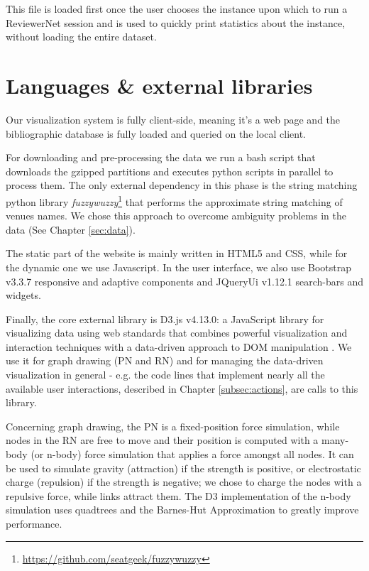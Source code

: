 This file is loaded first once the user chooses the instance upon which to run a ReviewerNet session and is used to quickly print statistics about the instance, without loading the entire dataset.
\section{Languages \& external libraries}
\label{sec:lang}

Our visualization system is fully client-side, meaning it's a web page and the bibliographic database is fully loaded and queried on the local client.

For downloading and pre-processing the data we run a bash script that downloads the gzipped partitions and executes python scripts in parallel to process them. The only external dependency in this phase is the string matching python library \emph{fuzzywuzzy}\footnote{\url{https://github.com/seatgeek/fuzzywuzzy}} that performs the approximate string matching of venues names. We chose this approach to overcome ambiguity problems in the data (See Chapter \ref{sec:data}).

The static part of the website is mainly written in HTML5 and CSS, while for the dynamic one we use Javascript. In the user interface, we also use Bootstrap v3.3.7 responsive and adaptive components and JQueryUi v1.12.1 search-bars and widgets.

Finally, the core external library is D3.js v4.13.0: a JavaScript library for visualizing data using web standards that combines powerful visualization and interaction techniques with a data-driven approach to DOM manipulation \cite{D3js11}. We use it for graph drawing (PN and RN) and for managing the data-driven visualization in general - e.g. the code lines that implement nearly all the available user interactions, described in Chapter \ref{subsec:actions}, are calls to this library.

Concerning graph drawing, the PN is a fixed-position force simulation, while nodes in the RN are free to move and their position is computed with a many-body (or n-body) force simulation that applies a force amongst all nodes. It can be used to simulate gravity (attraction) if the strength is positive, or electrostatic charge (repulsion) if the strength is negative; we chose to charge the nodes with a repulsive force, while links attract them. The D3 implementation of the n-body simulation uses quadtrees and the Barnes-Hut Approximation \cite{Barnes1986} to greatly improve performance.

